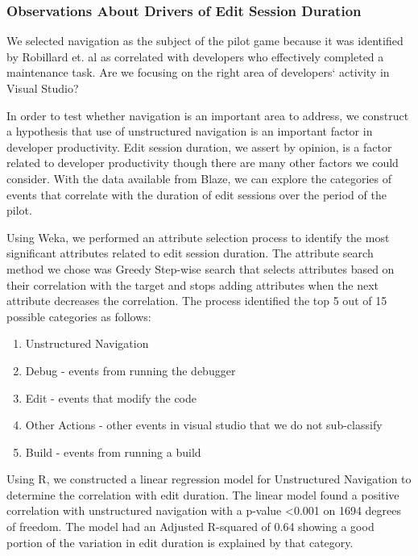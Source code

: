 \documentclass{sig-alternate}
\begin{document}
\subsubsection{Observations About Drivers of Edit Session Duration}

We selected navigation as the subject of the pilot game because it was identified by Robillard et. al\cite{wbsnipes:Robillard2004How} as correlated with developers who effectively completed a maintenance task.    Are we focusing on the right area of developers` activity in Visual Studio?

In order to test whether navigation is an important area to address, we construct a hypothesis that use of unstructured navigation is an important factor in developer productivity.  Edit session duration, we assert by opinion, is a factor related to developer productivity though there are many other factors we could consider.  With the data available from Blaze, we can explore the categories of events that correlate with the duration of edit sessions over the period of the pilot.  

Using Weka\cite{Hall2009WEKA}, we performed an attribute selection process to identify the most significant attributes related to edit session duration.  The attribute search method we chose was Greedy Step-wise search that selects attributes based on their correlation with the target and stops adding attributes when the next attribute decreases the correlation.    The process identified the top 5 out of 15 possible categories as follows:
\begin{enumerate}
\item Unstructured Navigation
\item Debug - events from running the debugger
\item Edit - events that modify the code
\item Other Actions - other events in visual studio that we do not sub-classify
\item Build - events from running a build
\end{enumerate}

Using R\cite{Rcitation}, we constructed a linear regression model for Unstructured Navigation to determine the correlation with edit duration.  The linear model found a positive correlation with unstructured navigation with a p-value <0.001 on 1694 degrees of freedom.  The model had an Adjusted R-squared of 0.64 showing a good portion of the variation in edit duration is explained by that category. 
\end{document}
